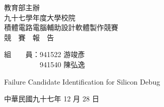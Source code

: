 \begin{titlepage}

\begin{center}

\begin{Large}
教育部主辦\\[1cm]
九十七學年度大學校院\\[1cm]
積體電路電腦輔助設計軟體製作競賽\\[1cm]
競　賽　報　告
\end{Large}

\vfill

\begin{large}
組　　員：941522 游竣彥\\
　　　　　941540 陳弘逸
\end{large}

\vfill

\begin{Large}
Failure Candidate Identification for Silicon Debug
\end{Large}

\vfill

\begin{large}
中華民國九十七年 12 月 28 日
\end{large}

\end{center}

\end{titlepage}

